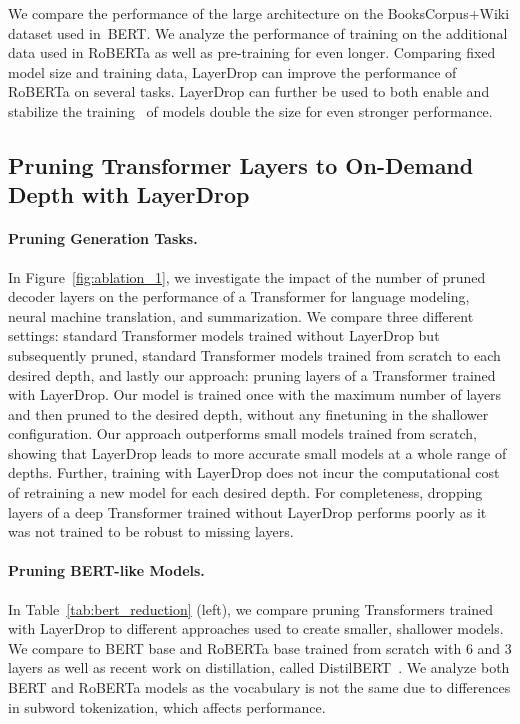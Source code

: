 We compare the performance of the large architecture on the BooksCorpus+Wiki dataset used in~BERT. We analyze the performance of training on the additional data used in RoBERTa as well as pre-training for even longer. Comparing fixed model size and training data,  LayerDrop can improve the performance of RoBERTa on several tasks. LayerDrop can further be used to both enable and stabilize the training~\citep{huang2016deep} of models double the size for even stronger performance.


\subsection{Pruning Transformer Layers to On-Demand Depth with LayerDrop}


\paragraph{Pruning Generation Tasks.} In Figure~\ref{fig:ablation_1}, we investigate the impact of the number of pruned decoder layers on the performance of a Transformer for language modeling, neural machine translation, and summarization.
We compare three different settings: standard Transformer models trained without LayerDrop but subsequently pruned, standard Transformer models trained from scratch to each desired depth, and lastly our approach: pruning layers of a Transformer trained with LayerDrop. Our model is trained once with the maximum number of layers and then pruned to the desired depth, without any finetuning in the shallower configuration.
Our approach outperforms small models trained from scratch, showing that LayerDrop leads to more accurate small models at a whole range of depths. Further, training with LayerDrop does not incur the computational cost of retraining a new model for each desired depth.
For completeness, dropping layers of a deep Transformer trained without LayerDrop performs poorly as it was not trained to be robust to missing layers.

\paragraph{Pruning BERT-like Models.} In Table~\ref{tab:bert_reduction} (left), we compare pruning Transformers trained with LayerDrop to different approaches used to create smaller, shallower models.
We compare to BERT base and RoBERTa base trained from scratch with $6$ and $3$ layers as well as recent work on distillation, called DistilBERT~\citep{distilbert}. We analyze both BERT and RoBERTa models as the vocabulary is not the same due to differences in subword tokenization, which affects performance.

